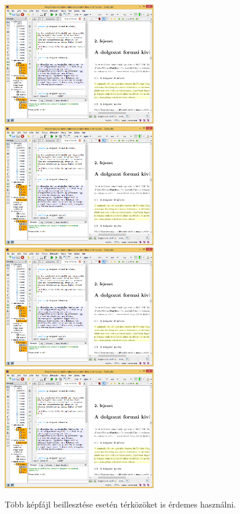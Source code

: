 \begin{figure}[!ht]
	\centering
	\includegraphics[width=67mm, keepaspectratio]{figures/TeXstudio.png}\hspace{1cm}
	\includegraphics[width=67mm, keepaspectratio]{figures/TeXstudio.png}\\\vspace{5mm}
	\includegraphics[width=67mm, keepaspectratio]{figures/TeXstudio.png}\hspace{1cm}
	\includegraphics[width=67mm, keepaspectratio]{figures/TeXstudio.png}
	\caption{Több képfájl beillesztése esetén térközöket is érdemes használni.}
	\label{fig:HVSpaces}
\end{figure}

